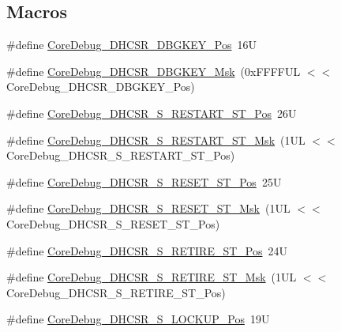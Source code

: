 \subsection*{Macros}
\begin{DoxyCompactItemize}
\item 
\#define \mbox{\hyperlink{group___c_m_s_i_s___core_debug_gac91280edd0ce932665cf75a23d11d842}{Core\+Debug\+\_\+\+D\+H\+C\+S\+R\+\_\+\+D\+B\+G\+K\+E\+Y\+\_\+\+Pos}}~16U
\item 
\#define \mbox{\hyperlink{group___c_m_s_i_s___core_debug_ga1ce997cee15edaafe4aed77751816ffc}{Core\+Debug\+\_\+\+D\+H\+C\+S\+R\+\_\+\+D\+B\+G\+K\+E\+Y\+\_\+\+Msk}}~(0x\+F\+F\+F\+F\+U\+L $<$$<$ Core\+Debug\+\_\+\+D\+H\+C\+S\+R\+\_\+\+D\+B\+G\+K\+E\+Y\+\_\+\+Pos)
\item 
\#define \mbox{\hyperlink{group___c_m_s_i_s___core_debug_gaf6498d32dbe23b8d95a12d2fbc0a65f8}{Core\+Debug\+\_\+\+D\+H\+C\+S\+R\+\_\+\+S\+\_\+\+R\+E\+S\+T\+A\+R\+T\+\_\+\+S\+T\+\_\+\+Pos}}~26U
\item 
\#define \mbox{\hyperlink{group___c_m_s_i_s___core_debug_gabe3254d40aaa482987ff31584d2a3240}{Core\+Debug\+\_\+\+D\+H\+C\+S\+R\+\_\+\+S\+\_\+\+R\+E\+S\+T\+A\+R\+T\+\_\+\+S\+T\+\_\+\+Msk}}~(1\+U\+L $<$$<$ Core\+Debug\+\_\+\+D\+H\+C\+S\+R\+\_\+\+S\+\_\+\+R\+E\+S\+T\+A\+R\+T\+\_\+\+S\+T\+\_\+\+Pos)
\item 
\#define \mbox{\hyperlink{group___c_m_s_i_s___core_debug_ga6f934c5427ea057394268e541fa97753}{Core\+Debug\+\_\+\+D\+H\+C\+S\+R\+\_\+\+S\+\_\+\+R\+E\+S\+E\+T\+\_\+\+S\+T\+\_\+\+Pos}}~25U
\item 
\#define \mbox{\hyperlink{group___c_m_s_i_s___core_debug_gac474394bcceb31a8e09566c90b3f8922}{Core\+Debug\+\_\+\+D\+H\+C\+S\+R\+\_\+\+S\+\_\+\+R\+E\+S\+E\+T\+\_\+\+S\+T\+\_\+\+Msk}}~(1\+U\+L $<$$<$ Core\+Debug\+\_\+\+D\+H\+C\+S\+R\+\_\+\+S\+\_\+\+R\+E\+S\+E\+T\+\_\+\+S\+T\+\_\+\+Pos)
\item 
\#define \mbox{\hyperlink{group___c_m_s_i_s___core_debug_ga2328118f8b3574c871a53605eb17e730}{Core\+Debug\+\_\+\+D\+H\+C\+S\+R\+\_\+\+S\+\_\+\+R\+E\+T\+I\+R\+E\+\_\+\+S\+T\+\_\+\+Pos}}~24U
\item 
\#define \mbox{\hyperlink{group___c_m_s_i_s___core_debug_ga89dceb5325f6bcb36a0473d65fbfcfa6}{Core\+Debug\+\_\+\+D\+H\+C\+S\+R\+\_\+\+S\+\_\+\+R\+E\+T\+I\+R\+E\+\_\+\+S\+T\+\_\+\+Msk}}~(1\+U\+L $<$$<$ Core\+Debug\+\_\+\+D\+H\+C\+S\+R\+\_\+\+S\+\_\+\+R\+E\+T\+I\+R\+E\+\_\+\+S\+T\+\_\+\+Pos)
\item 
\#define \mbox{\hyperlink{group___c_m_s_i_s___core_debug_ga2900dd56a988a4ed27ad664d5642807e}{Core\+Debug\+\_\+\+D\+H\+C\+S\+R\+\_\+\+S\+\_\+\+L\+O\+C\+K\+U\+P\+\_\+\+Pos}}~19U

\end{DoxyCompactItemize}
